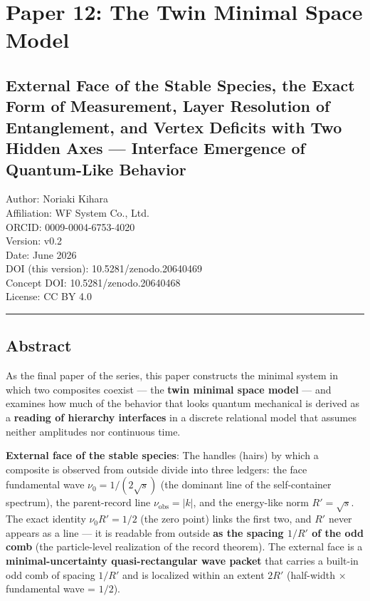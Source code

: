 \documentclass[
]{article}
\author{}
\date{}
\begin{document}
\section{Paper 12: The Twin Minimal Space
Model}\label{paper-12-the-twin-minimal-space-model}

\subsection{External Face of the Stable Species, the Exact Form of
Measurement, Layer Resolution of Entanglement, and Vertex Deficits with
Two Hidden Axes --- Interface Emergence of Quantum-Like
Behavior}\label{external-face-of-the-stable-species-the-exact-form-of-measurement-layer-resolution-of-entanglement-and-vertex-deficits-with-two-hidden-axes-interface-emergence-of-quantum-like-behavior}

Author: Noriaki Kihara\\
Affiliation: WF System Co., Ltd.\\
ORCID: 0009-0004-6753-4020\\
Version: v0.2\\
Date: June 2026\\
DOI (this version): 10.5281/zenodo.20640469\\
Concept DOI: 10.5281/zenodo.20640468\\
License: CC BY 4.0

\begin{center}\rule{0.5\linewidth}{0.5pt}\end{center}

\subsection{Abstract}\label{abstract}

As the final paper of the series, this paper constructs the minimal
system in which two composites coexist --- the \textbf{twin minimal
space model} --- and examines how much of the behavior that looks
quantum mechanical is derived as a \textbf{reading of hierarchy
interfaces} in a discrete relational model that assumes neither
amplitudes nor continuous time.

\textbf{External face of the stable species}: The handles (hairs) by
which a composite is observed from outside divide into three ledgers:
the face fundamental wave \(\nu_0=1/(2\sqrt s)\) (the dominant line of
the self-container spectrum), the parent-record line
\(\nu_{\mathrm{obs}}=|k|\), and the energy-like norm \(R'=\sqrt s\). The
exact identity \(\nu_0 R'=1/2\) (the zero point) links the first two,
and \(R'\) never appears as a line --- it is readable from outside
\textbf{as the spacing \(1/R'\) of the odd comb} (the particle-level
realization of the record theorem). The external face is a
\textbf{minimal-uncertainty quasi-rectangular wave packet} that carries
a built-in odd comb of spacing \(1/R'\) and is localized within an
extent \(2R'\) (half-width × fundamental wave = \(1/2\)).
\end{document}

